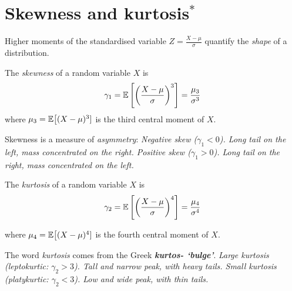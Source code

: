 \section{Skewness and kurtosis$^{*}$}
Higher moments of the standardised variable $\displaystyle Z=\frac{X-\mu}{\sigma}$ quantify the \emph{shape} of a distribution.
\begin{definition}
The \emph{skewness} of a random variable $X$ is 
\[
\gamma_1 = \mathbb{E}\left[\left(\frac{X-\mu}{\sigma}\right)^3\right] = \frac{\mu_{3}}{\sigma^3}
\]
where $\mu_3 = \mathbb{E}\big[(X-\mu)^3]$ is the third central moment of $X$. 
\end{definition}

Skewness is a measure of \emph{asymmetry}:
\bit
\it Negative skew ($\gamma_1 < 0$). Long tail on the left, mass concentrated on the right.
\it Positive skew ($\gamma_1 > 0$). Long tail on the right, mass concentrated on the left.
\eit


\begin{definition}
The \emph{kurtosis} of a random variable $X$ is 
\[
\gamma_2 = \mathbb{E}\left[\left(\frac{X-\mu}{\sigma}\right)^4\right] = \frac{\mu_{4}}{\sigma^4}
\]
\end{definition}
where $\mu_4 = \mathbb{E}\big[(X-\mu)^4]$ is the fourth central moment of $X$.

\bigskip
The word \textit{kurtosis} comes from the Greek \textbf{\textit{kurtos- `bulge'}}.
\bit
\it Large kurtosis (leptokurtic: $\gamma_2 > 3$). Tall and narrow peak, with heavy tails.
\it Small kurtosis (platykurtic: $\gamma_2 < 3$). Low and wide peak, with thin tails.
\eit


